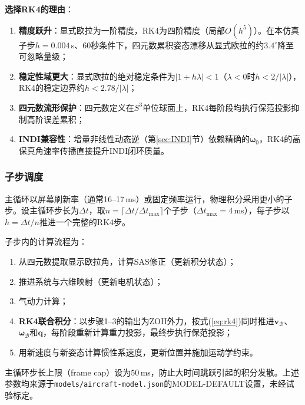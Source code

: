 \textbf{选择RK4的理由}：
\begin{enumerate}[label=(\arabic*)]
    \item \textbf{精度跃升}：显式欧拉为一阶精度，RK4为四阶精度（局部$O(h^5)$）。在本仿真子步$h=0.004$\,s、60秒条件下，四元数累积姿态漂移从显式欧拉的约$3.4^\circ$降至可忽略量级；
    \item \textbf{稳定性域更大}：显式欧拉的绝对稳定条件为$|1+h\lambda|<1$（$\lambda<0$时$h<2/|\lambda|$），RK4的稳定边界约$h<2.78/|\lambda|$；
    \item \textbf{四元数流形保护}：四元数定义在$S^3$单位球面上，RK4每阶段均执行保范投影抑制高阶误差累积；
    \item \textbf{INDI兼容性}：增量非线性动态逆（第\ref{sec:INDI}节）依赖精确的$\dot{\boldsymbol{\omega}}_0$，RK4的高保真角速率传播直接提升INDI闭环质量。
\end{enumerate}

\subsubsection{子步调度}

主循环以屏幕刷新率（通常16--17\,ms）或固定频率运行，物理积分采用更小的子步。设主循环步长为$\Delta t$，取$n = \lceil \Delta t / \Delta t_{\max} \rceil$个子步（$\Delta t_{\max}=4$\,ms），每子步以$h = \Delta t / n$推进一个完整的RK4步。

子步内的计算流程为：
\begin{enumerate}[label=(\arabic*)]
    \item 从四元数提取显示欧拉角，计算SAS修正（更新积分状态）；
    \item 推进系统与六维映射（更新电机状态）；
    \item 气动力计算；
    \item \textbf{RK4联合积分}：以步骤1--3的输出为ZOH外力，按式(\ref{eq:rk4})同时推进$\mathbf{v}_{\mathcal{B}}$、$\boldsymbol{\omega}_{\mathcal{B}}$和$\mathbf{q}$，每阶段重新计算重力投影，最终步执行保范投影；
    \item 用新速度与新姿态计算惯性系速度，更新位置并施加运动学约束。
\end{enumerate}

主循环步长上限（frame cap）设为$50$\,ms，防止大时间跳跃引起的积分发散。上述参数均来源于\texttt{models/aircraft-model.json}的MODEL-DEFAULT设置，未经试验标定。

